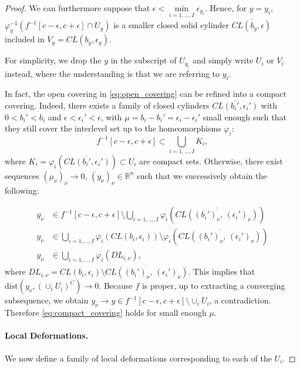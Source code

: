 \documentclass[11pt]{article}
\newcommand{\R}{\mathbb{R}}
\newcommand{\eps}{\epsilon}
\newcommand{\inter}{\cap}
\newcommand{\union}{\cup}
\newcommand{\dist}{\mathrm{dist}}
\theoremstyle{plain}
\theoremstyle{definition}
\theoremstyle{remark}
\begin{document}
\begin{proof}
We can furthermore suppose that $\eps < \min\limits_{i = 1, \ldots, I} \eps_{y_i}$. Hence, for $y = y_i$, $\varphi_{y}^{-1}( f^{-1}[c-\eps, c+ \eps] \inter U_{y})$ is a smaller closed solid cylinder $\overline{CL(b_y, \eps)}$ included in $V_y = CL(b_y, \eps_y)$.

For simplicity, we drop the $y$ in the subscript of $U_{y_i}$ and simply write $U_i$ or $V_i$ instead, where the understanding is that we are referring to $y_i$.

In fact, the open covering in \eqref{eq:open_covering} can be refined into a compact covering. Indeed, there exists a family of closed cylinders $\overline{CL(b_i', \eps_i')}$ with $0 < b_i' < b_i$ and $\eps < \eps_i' < \eps$, with $\mu = b_i - b_i' = \eps_i - \eps_i'$ small enough such that they still cover the interlevel set up to the homeomorphisms $\varphi_i$:
\begin{equation}
	\label{eq:compact_covering}
	f^{-1}[c-\eps, c+ \eps] \subset \bigcup\limits_{i = 1, \ldots, I} K_i,
\end{equation}
where $K_i = \varphi_i(\overline{CL(b_i', \eps_i')}) \subset U_i$ are compact sets.
Otherwise, there exist sequences $(\mu_\nu)_\nu \to 0$, $(y_\nu)_\nu \in \R^n$ such that we successively obtain the following:

\begin{align*}
y_\nu &\in f^{-1}[c-\eps, c+ \eps] \setminus \bigcup\limits_{i = 1, \ldots, I} \varphi_i(\overline{CL((b_i')_\nu,\, (\eps_i')_\nu)}) \\
y_\nu &\in \bigcup\limits_{i = 1, \ldots, I} \varphi_i(CL(b_i, \eps_i)) \setminus \varphi_i(\overline{CL((b_i')_\nu,\,  (\eps_i')_\nu)})\\
y_\nu &\in \bigcup\limits_{i = 1, \ldots, I} \varphi_i(DL_{i, \nu}),
\end{align*}
where $DL_{i, \nu} = CL(b_i, \eps_i) \setminus \overline{CL((b_i')_\nu,\,  (\eps_i')_\nu)}$. This implies that $\dist(y_\nu, (\union_i U_i)^C) \to 0$.
Because $f$ is proper, up to extracting a converging subsequence, we obtain $y_\nu \to y \in f^{-1}[c-\eps, c+ \eps] \setminus \union_i U_i$, a contradiction. Therefore \eqref{eq:compact_covering} holds for small enough $\mu$.

\paragraph{Local Deformations.}  We now define a family of local deformations corresponding to each of the $U_{i}$.
	

\end{proof}
\end{document}

